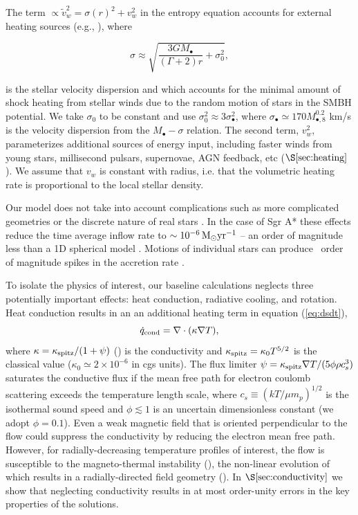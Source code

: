 \documentclass[usenatbib,fleqn]{mn2e}
\newcommand{\vw}{\tilde{v}_{w}}
\newcommand{\Mbh}[1][]{M_{\bullet#1}}
\newcommand{\Mbheight}{M_{\bullet,8}}
\newcommand{\pyear}{{\rm yr}^{-1}}
\begin{document}
The term $\propto \vw^2 = \sigma(r)^2+v_{w}^2$ in the entropy equation
accounts for external heating sources (e.g.,
\citealt{ShcherbakovWong+:2014a}), where

\begin{equation}
\sigma \approx \sqrt{\frac{3 G \Mbh}{(\Gamma+2)
    r}+\sigma_0^2},
\label{eq:sigmarel}
\end{equation}

is the stellar velocity dispersion and which accounts for the minimal
amount of shock heating from stellar winds due to the random motion of
stars in the SMBH potential. We take $\sigma_0$ to be constant and use
$\sigma_0^{2} \approx 3 \sigma_{\bullet}^2$, where
$\sigma_{\bullet}\simeq 170 \Mbheight^{0.2}$ km/s is the velocity
dispersion from the \citet{McConnellMa+:2011a} $\Mbh-\sigma$
relation.  The second term, $v_{w}^{2}$, parameterizes additional sources of
energy input, including faster winds from young stars, millisecond
pulsars, supernovae, AGN feedback, etc ($\S\ref{sec:heating}$).  We
assume that $v_w$ is constant with radius, i.e. that the volumetric
heating rate is proportional to the local stellar density. 

Our model does not take into account complications such as more
complicated geometries or the discrete nature of real stars
\citep{Cuadra+2006, Cuadra+2008}. In the case of Sgr A* these effects
reduce the time average inflow rate to $\sim10^{-6} \Msun \pyear$ --
an order of magnitude less than a 1D spherical model
\citep{Cuadra+2006}.  Motions of individual stars can produce ~order
of magnitude spikes in the accretion rate \citep{Cuadra+2008}.

To isolate the physics of interest, our baseline calculations
neglects three potentially important effects: heat conduction,
radiative cooling, and rotation.  Heat conduction results in
an an additional heating term in equation (\ref{eq:dsdt}),
\begin{equation}
\dot{q}_{\rm cond} = \nabla\cdot(\kappa \nabla T),
\label{eq:qdotcond}
 \end{equation}
 where $\kappa =\kappa_{\rm spitz}/(1+\psi)$
 (\citealt{DaltonBalbus:1993a}) is the conductivity and $\kappa_{\rm
   spitz} = \kappa_0 T^{5/2}$ is the classical \citet{Spitzer62} value
 ($\kappa_0\simeq 2\times 10^{-6}$ in cgs units).  The flux limiter
 $\psi = \kappa_{\rm spitz} \nabla T/(5\phi \rho c_s^3)$ saturates the
 conductive flux if the mean free path for electron coulomb scattering
 exceeds the temperature length scale, where $c_s \equiv (kT/\mu
 m_p)^{1/2}$ is the isothermal sound speed and $\phi \lesssim 1$ is an
 uncertain dimensionless constant (we adopt $\phi = 0.1$).  Even a
 weak magnetic field that is oriented perpendicular to the flow could
 suppress the conductivity by reducing the electron mean free path.
 However, for radially-decreasing temperature profiles of interest,
 the flow is susceptible to the magneto-thermal instability
 (\citealt{Balbus01}), the non-linear evolution of which results in a
 radially-directed field geometry (\citealt{Parrish&Stone07}).  In
 $\S\ref{sec:conductivity}$ we show that neglecting conductivity
 results in at most order-unity errors in the key properties of the
 solutions.
\end{document}
